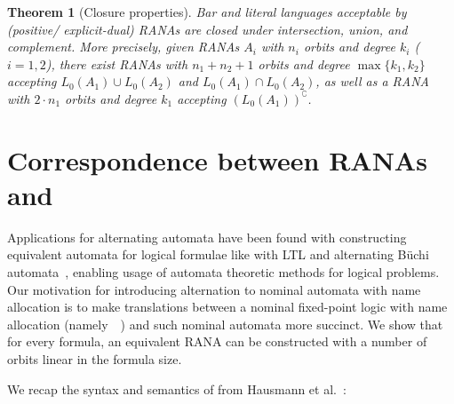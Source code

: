 \documentclass[10pt,a4paper]{amsart}
\newtheorem{theo}{Theorem}[section]
\theoremstyle{definition}
\renewcommand{\textsf}[1]{{\oldtextsf{\small#1}}}
\newcommand{\muBar}{\mbox{\textsf{Bar-$\mu$TL}}\xspace}
\begin{document}
\begin{theo}[Closure properties] \label{thm:closure} Bar and literal
  languages acceptable by (positive/ explicit-dual) RANAs are closed
  under intersection, union, and complement. More precisely, given RANAs $A_i$ with $n_i$ orbits and degree $k_i$ ($i=1,2$), there exist RANAs with $n_1+n_2+1$ orbits and degree $\max\{k_1,k_2\}$ accepting $L_0(A_1)\cup L_0(A_2)$ and $L_0(A_1)\cap L_0(A_2)$, as well as a RANA with $2\cdot n_1$ orbits and degree $k_1$ accepting $(L_0(A_1))^\complement$.
\end{theo}

\section{Correspondence between RANAs and \muBar}\label{sec:logic}

Applications for alternating automata have been found with constructing equivalent
automata for logical formulae like with LTL and alternating Büchi automata~\cite{mss88,var94}, enabling usage of automata theoretic methods
for logical problems.
Our motivation for introducing alternation to nominal automata with name allocation is to
make translations between a nominal fixed-point logic with name allocation (namely~\muBar~\cite{hms21})
and such nominal automata more succinct. We show that for every \muBar formula, an equivalent
RANA can be constructed with a number of orbits linear in the formula size.

We recap the syntax and semantics of \muBar from Hausmann et al.~\cite{hms21}:
\end{document}
